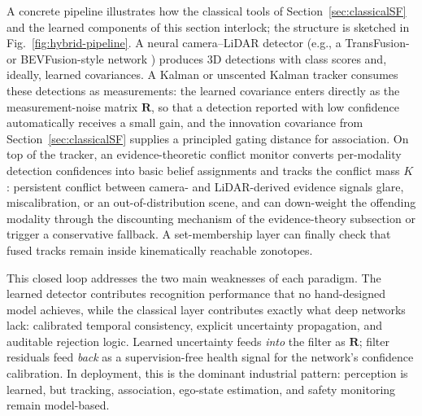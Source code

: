 \documentclass{ieeeaccess}
\begin{document}
{\color{blue}
A concrete pipeline illustrates how the classical tools of Section~\ref{sec:classicalSF} and the learned components of this section interlock; the structure is sketched in Fig.~\ref{fig:hybrid-pipeline}. A neural camera--LiDAR detector (e.g., a TransFusion- or BEVFusion-style network \cite{bai2022_transfusion,liu2023_bevfusion}) produces 3D detections with class scores and, ideally, learned covariances. A Kalman or unscented Kalman tracker consumes these detections as measurements: the learned covariance enters directly as the measurement-noise matrix $\mathbf{R}$, so that a detection reported with low confidence automatically receives a small gain, and the innovation covariance from Section~\ref{sec:classicalSF} supplies a principled gating distance for association. On top of the tracker, an evidence-theoretic conflict monitor converts per-modality detection confidences into basic belief assignments and tracks the conflict mass $K$: persistent conflict between camera- and LiDAR-derived evidence signals glare, miscalibration, or an out-of-distribution scene, and can down-weight the offending modality through the discounting mechanism of the evidence-theory subsection or trigger a conservative fallback. A set-membership layer can finally check that fused tracks remain inside kinematically reachable zonotopes.

This closed loop addresses the two main weaknesses of each paradigm. The learned detector contributes recognition performance that no hand-designed model achieves, while the classical layer contributes exactly what deep networks lack: calibrated temporal consistency, explicit uncertainty propagation, and auditable rejection logic. Learned uncertainty feeds \emph{into} the filter as $\mathbf{R}$; filter residuals feed \emph{back} as a supervision-free health signal for the network's confidence calibration. In deployment, this is the dominant industrial pattern: perception is learned, but tracking, association, ego-state estimation, and safety monitoring remain model-based.

}
\end{document}
